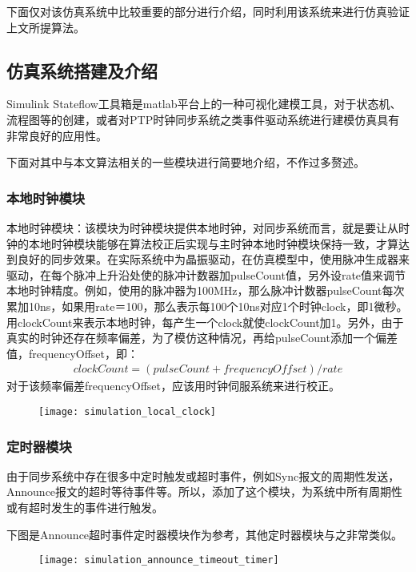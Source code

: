 下面仅对该仿真系统中比较重要的部分进行介绍，同时利用该系统来进行仿真验证上文所提算法。

\subsection{仿真系统搭建及介绍}
Simulink Stateflow工具箱是matlab平台上的一种可视化建模工具，对于状态机、流程图等的创建，或者对PTP时钟同步系统之类事件驱动系统进行建模仿真具有非常良好的应用性。

下面对其中与本文算法相关的一些模块进行简要地介绍，不作过多赘述。

\subsubsection{本地时钟模块}
本地时钟模块：该模块为时钟模块提供本地时钟，对同步系统而言，就是要让从时钟的本地时钟模块能够在算法校正后实现与主时钟本地时钟模块保持一致，才算达到良好的同步效果。在实际系统中为晶振驱动，在仿真模型中，使用脉冲生成器来驱动，在每个脉冲上升沿处使的脉冲计数器加pulseCount值，另外设rate值来调节本地时钟精度。例如，使用的脉冲器为100MHz，那么脉冲计数器pulseCount每次累加10ns，如果用rate＝100，那么表示每100个10ns对应1个时钟clock，即1微秒。用clockCount来表示本地时钟，每产生一个clock就使clockCount加1。另外，由于真实的时钟还存在频率偏差，为了模仿这种情况，再给pulseCount添加一个偏差值，frequencyOffset，即：
\begin{align}
  clockCount = (pulseCount + frequencyOffset) / rate
\end{align}
对于该频率偏差frequencyOffset，应该用时钟伺服系统来进行校正。
\begin{figure}[!hbp]
  \centering
  \begin{minipage}[b]{1\textwidth}
    \captionstyle{\centering}
    \centering
    \texttt{[image: simulation\_local\_clock]}
  \end{minipage}     
\end{figure}

\subsubsection{定时器模块}
由于同步系统中存在很多中定时触发或超时事件，例如Sync报文的周期性发送，Announce报文的超时等待事件等。所以，添加了这个模块，为系统中所有周期性或有超时发生的事件进行触发。

下图是Announce超时事件定时器模块作为参考，其他定时器模块与之非常类似。
\begin{figure}[!hbp]
  \centering
  \begin{minipage}[b]{1\textwidth}
    \captionstyle{\centering}
    \centering
    \texttt{[image: simulation\_announce\_timeout\_timer]}
  \end{minipage}     
\end{figure}

